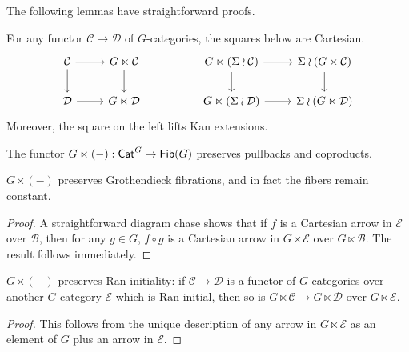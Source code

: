 \documentclass[a4paper,10pt
,draft
]{article}%
\renewcommand{\1}{\eta}%
\begin{document}
The following lemmas have straightforward proofs.

\begin{lemma}
      \label{GD_PULL_LEM}
      For any functor $\mathcal C \to \mathcal D$ of $G$-categories, the squares below are Cartesian.
      \begin{equation}
            \begin{tikzcd}
                  \mathcal C \arrow[d] \arrow[r]
                  &
                  G \ltimes \mathcal C \arrow[d]
                  &&
                  G \ltimes (\Sigma \wr \mathcal C) \arrow[d] \arrow[r]
                  &
                  \Sigma \wr (G \ltimes \mathcal C) \arrow[d]
                  \\
                  \mathcal D \arrow[r]
                  &
                  G \ltimes \mathcal D
                  &&
                  G \ltimes (\Sigma \wr \mathcal D) \arrow[r]
                  &
                  \Sigma \wr (G \ltimes \mathcal D)
            \end{tikzcd}
      \end{equation}
      Moreover, the square on the left lifts Kan extensions.
\end{lemma}

\begin{lemma}
      \label{GL_PULL_LEM}
      The functor $G \ltimes (-): \mathsf{Cat}^{G} \to \mathsf{Fib}(G)$ preserves pullbacks and coproducts.
\end{lemma}

\begin{lemma}
      \label{GL_GR_LEM}
      $G \ltimes (-)$ preserves Grothendieck fibrations, and in fact the fibers remain constant.
\end{lemma}
\begin{proof}
      A straightforward diagram chase shows that if $f$ is a Cartesian arrow in $\mathcal E$ over $\mathcal B$,
      then for any $g\in G$, $f \circ g$ is a Cartesian arrow in $G \ltimes \mathcal E$ over $G \ltimes \mathcal B$.
      The result follows immediately.
\end{proof}

\begin{lemma}
      \label{GL_RANINIT_LEM}
      $G \ltimes (-)$ preserves Ran-initiality:
      if $\mathcal C \to \mathcal D$ is a functor of $G$-categories over another $G$-category $\mathcal E$
      which is Ran-initial, then so is $G \ltimes \mathcal C \to G \ltimes \mathcal D$ over $G \ltimes \mathcal E$.
\end{lemma}
\begin{proof} 
      This follows from the unique description of any arrow in $G \ltimes \mathcal E$ as an element of $G$ plus an arrow in $\mathcal E$. 
\end{proof}
\end{document}
